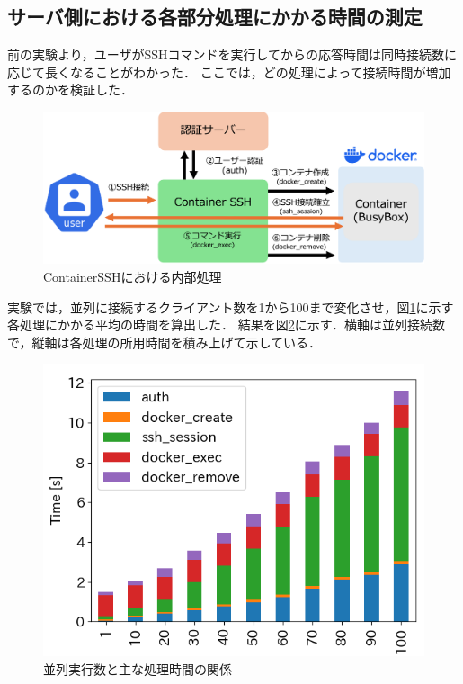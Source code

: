 \documentclass[dvipdfmx]{cs-handout}
\begin{document}
\subsection{サーバ側における各部分処理にかかる時間の測定}

前の実験より，ユーザがSSHコマンドを実行してからの応答時間は同時接続数に応じて長くなることがわかった．
ここでは，どの処理によって接続時間が増加するのかを検証した．

%
\begin{figure}[tb]
\includegraphics[width=\linewidth]{./fig/step.png}
\caption{ContainerSSHにおける内部処理}
\label{fig:step}
\end{figure}
%


実験では，並列に接続するクライアント数を1から100まで変化させ，図\ref{fig:step}に示す各処理にかかる平均の時間を算出した．
結果を図\ref{fig:detail}に示す．横軸は並列接続数で，縦軸は各処理の所用時間を積み上げて示している．
%
\begin{figure}[tb]
\includegraphics[width=0.9\linewidth]{./fig/detail.png}
\caption{並列実行数と主な処理時間の関係}
\label{fig:detail}
\end{figure}
%
\end{document}

